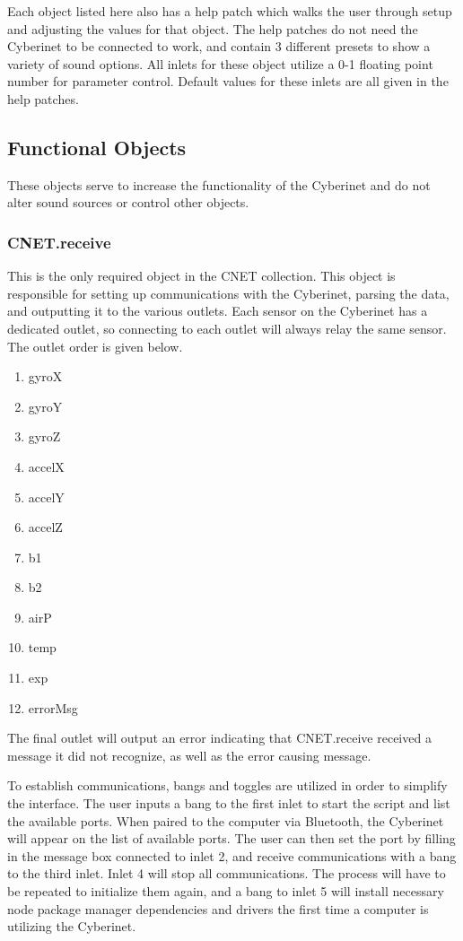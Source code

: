 Each object listed here also has a help patch which walks the user through setup and adjusting the values for that object. The help patches do not need the Cyberinet to be connected to work, and contain 3 different presets to show a variety of sound options. All inlets for these object utilize a 0-1 floating point number for parameter control. Default values for these inlets are all given in the help patches.

\subsection{Functional Objects}
These objects serve to increase the functionality of the Cyberinet and do not alter sound sources or control other objects.

\subsubsection{CNET.receive}
This is the only required object in the CNET collection. This object is responsible for setting up communications with the Cyberinet, parsing the data, and outputting it to the various outlets. Each sensor on the Cyberinet has a dedicated outlet, so connecting to each outlet will always relay the same sensor. The outlet order is given below.

\begin{enumerate}
    \item gyroX
    \item gyroY
    \item gyroZ
    \item accelX
    \item accelY
    \item accelZ
    \item b1
    \item b2
    \item airP
    \item temp
    \item exp
    \item errorMsg
\end{enumerate}

The final outlet will output an error indicating that CNET.receive received a message it did not recognize, as well as the error causing message.

To establish communications, bangs and toggles are utilized in order to simplify the interface. The user inputs a bang to the first inlet to start the script and list the available ports. When paired to the computer via Bluetooth, the Cyberinet will appear on the list of available ports. The user can then set the port by filling in the message box connected to inlet 2, and receive communications with a bang to the third inlet. Inlet 4 will stop all communications. The process will have to be repeated to initialize them again, and a bang to inlet 5 will install necessary node package manager dependencies and drivers the first time a computer is utilizing the Cyberinet.

